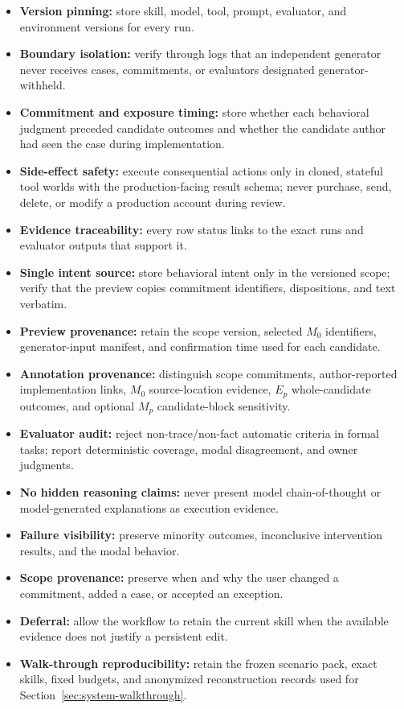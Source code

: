 \begin{itemize}[leftmargin=*]
    \item \textbf{Version pinning:} store skill, model, tool, prompt, evaluator, and environment versions for every run.
    \item \textbf{Boundary isolation:} verify through logs that an independent generator never receives cases, commitments, or evaluators designated generator-withheld.
    \item \textbf{Commitment and exposure timing:} store whether each behavioral judgment preceded candidate outcomes and whether the candidate author had seen the case during implementation.
    \item \textbf{Side-effect safety:} execute consequential actions only in cloned, stateful tool worlds with the production-facing result schema; never purchase, send, delete, or modify a production account during review.
    \item \textbf{Evidence traceability:} every row status links to the exact runs and evaluator outputs that support it.
    \item \textbf{Single intent source:} store behavioral intent only in the versioned scope; verify that the preview copies commitment identifiers, dispositions, and text verbatim.
    \item \textbf{Preview provenance:} retain the scope version, selected $M_0$ identifiers, generator-input manifest, and confirmation time used for each candidate.
    \item \textbf{Annotation provenance:} distinguish scope commitments, author-reported implementation links, $M_0$ source-location evidence, $E_p$ whole-candidate outcomes, and optional $M_p$ candidate-block sensitivity.
    \item \textbf{Evaluator audit:} reject non-trace/non-fact automatic criteria in formal tasks; report deterministic coverage, modal disagreement, and owner judgments.
    \item \textbf{No hidden reasoning claims:} never present model chain-of-thought or model-generated explanations as execution evidence.
    \item \textbf{Failure visibility:} preserve minority outcomes, inconclusive intervention results, and the modal behavior.
    \item \textbf{Scope provenance:} preserve when and why the user changed a commitment, added a case, or accepted an exception.
    \item \textbf{Deferral:} allow the workflow to retain the current skill when the available evidence does not justify a persistent edit.
    \item \textbf{Walk-through reproducibility:} retain the frozen scenario pack, exact skills, fixed budgets, and anonymized reconstruction records used for Section~\ref{sec:system-walkthrough}.
\end{itemize}
